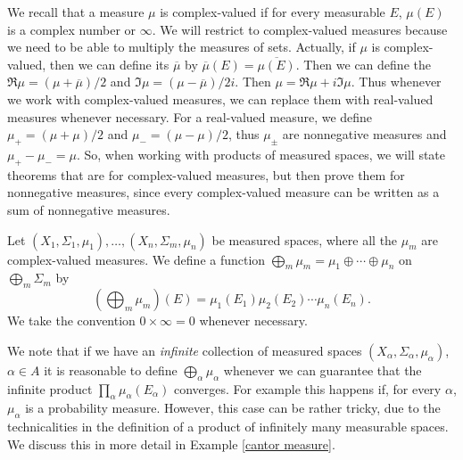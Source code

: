 We recall that a measure $\mu$ is complex-valued if for every measurable $E$, $\mu(E)$ is a complex number or $\infty$.
We will restrict to complex-valued measures because we need to be able to multiply the measures of sets.
Actually, if $\mu$ is complex-valued, then we can define its  $\overline \mu$ by $\overline \mu(E) = \overline{\mu(E)}$.
Then we can define the  $\Re \mu = (\mu + \overline \mu)/2$ and  $\Im \mu = (\mu - \overline \mu)/2i$.
Then $\mu = \Re \mu + i\Im \mu$.
Thus whenever we work with complex-valued measures, we can replace them with real-valued measures whenever necessary.
For a real-valued measure, we define $\mu_+ = (\mu + \mu)/2$ and $\mu_- = (\mu - \mu)/2$, thus $\mu_\pm$ are nonnegative measures and $\mu_+ - \mu_- = \mu$.
So, when working with products of measured spaces, we will state theorems that are for complex-valued measures, but then prove them for nonnegative measures, since every complex-valued measure can be written as a sum of nonnegative measures.

\begin{definition}
Let $(X_1, \Sigma_1, \mu_1), \dots, (X_{n}, \Sigma_{m}, \mu_{n})$ be measured spaces, where all the $\mu_{m}$ are complex-valued measures.
We define a function $\bigoplus_{m} \mu_{m} = \mu_1 \oplus \cdots \oplus \mu_{n}$ on $\bigoplus_{m} \Sigma_{m}$ by
\[\left(\bigoplus_{m} \mu_{m}\right)(E) = \mu_1(E_1)\mu_2(E_2) \cdots \mu_{n}(E_{n}).\]
We take the convention $0 \times \infty = 0$ whenever necessary.
\end{definition}

We note that if we have an \emph{infinite} collection of measured spaces $(X_\alpha, \Sigma_\alpha, \mu_\alpha)$, $\alpha \in A$ it is reasonable to define $\bigoplus_{\alpha} \mu_\alpha$ whenever we can guarantee that the infinite product $\prod_{\alpha} \mu_\alpha(E_\alpha)$ converges.
For example this happens if, for every $\alpha$, $\mu_\alpha$ is a probability measure.
However, this case can be rather tricky, due to the technicalities in the definition of a product of infinitely many measurable spaces.
We discuss this in more detail in Example \ref{cantor measure}.

